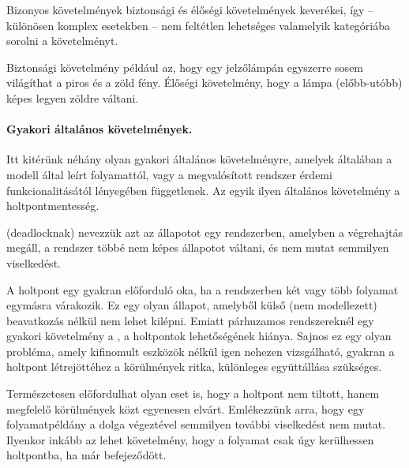 Bizonyos követelmények biztonsági és élőségi követelmények keverékei, így -- különösen komplex esetekben -- nem feltétlen lehetséges valamelyik kategóriába sorolni a követelményt.

\begin{megjegyzes}
Biztonsági követelmény például az, hogy egy jelzőlámpán egyszerre sosem világíthat a piros és a zöld fény. Élőségi követelmény, hogy a lámpa (előbb-utóbb) képes legyen zöldre váltani.
\end{megjegyzes}


\paragraph{Gyakori általános követelmények.}
Itt kitérünk néhány olyan gyakori általános követelményre, amelyek általában a modell által leírt folyamattól, vagy a megvalósított rendszer érdemi funkcionalitásától lényegében függetlenek.
Az egyik ilyen általános követelmény a holtpontmentesség.

\begin{definicio}
 (deadlocknak) nevezzük azt az állapotot egy rendszerben, amelyben a végrehajtás megáll, a rendszer többé nem képes állapotot váltani, és nem mutat semmilyen viselkedést.
\end{definicio}

A holtpont egy gyakran előforduló oka, ha a rendszerben két vagy több folyamat egymásra várakozik. Ez egy olyan állapot, amelyből külső (nem modellezett) beavatkozás nélkül nem lehet kilépni. Emiatt párhuzamos rendszereknél egy gyakori követelmény a , a holtpontok lehetőségének hiánya. Sajnos ez egy olyan probléma, amely kifinomult eszközök nélkül igen nehezen vizsgálható, gyakran a holtpont létrejöttéhez a körülmények ritka, különleges együttállása szükséges.

\begin{megjegyzes}
Természetesen előfordulhat olyan eset is, hogy a holtpont nem tiltott, hanem megfelelő körülmények közt egyenesen elvárt. Emlékezzünk arra, hogy egy folyamatpéldány a dolga végeztével semmilyen további viselkedést nem mutat. Ilyenkor inkább az lehet követelmény, hogy a folyamat csak úgy kerülhessen holtpontba, ha már befejeződött.
\end{megjegyzes}

